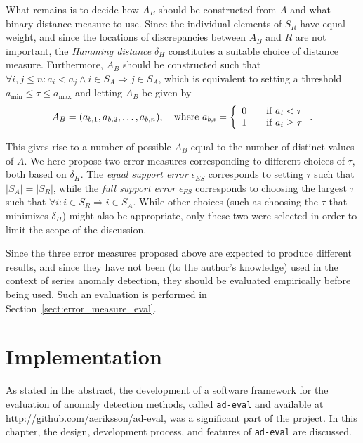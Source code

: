 What remains is to decide how $A_B$ should be constructed from $A$ and what binary distance measure to use. Since the individual elements of $S_R$ have equal weight, and since the locations of discrepancies between $A_B$ and $R$ are not important, the \emph{Hamming distance} $\delta_H$ constitutes a suitable choice of distance measure. Furthermore, $A_B$ should be constructed such that $\forall i, j \leq n: a_i < a_j \wedge i \in S_A \Rightarrow j \in S_A$, which is equivalent to setting a threshold $a_{\min} \leq \tau \leq a_{\max}$ and letting $A_B$ be given by 
\[
    A_B = (a_{b,1}, a_{b,2}, \dots, a_{b,n}), \quad \text{where } a_{b,i} = \left\{ 
    \begin{array}{l l}
        0 & \quad \text{if } a_i < \tau \\
        1 & \quad \text{if } a_i \geq \tau
    \end{array} \right..
\]

This gives rise to a number of possible $A_B$ equal to the number of distinct values of $A$. We here propose two error measures corresponding to different choices of $\tau$, both based on $\delta_H$. The \emph{equal support error} $\epsilon_{ES}$ corresponds to setting $\tau$ such that $|S_A| = |S_R|$, while the \emph{full support error} $\epsilon_{FS}$ corresponds to choosing the largest $\tau$ such that $\forall i: i \in S_R \Rightarrow i \in S_A$. While other choices (such as choosing the $\tau$ that minimizes $\delta_H$) might also be appropriate, only these two were selected in order to limit the scope of the discussion.

Since the three error measures proposed above are expected to produce different results, and since they have not been (to the author's knowledge) used in the context of series anomaly detection, they should be evaluated empirically before being used. Such an evaluation is performed in Section~\ref{sect:error_measure_eval}.

\section{Implementation}
\label{ch:implementation}

As stated in the abstract, the development of a software framework for the evaluation of anomaly detection methods, called \texttt{ad-eval} and available at \url{http://github.com/aeriksson/ad-eval}, was a significant part of the project. In this chapter, the design, development process, and features of \texttt{ad-eval} are discussed.


